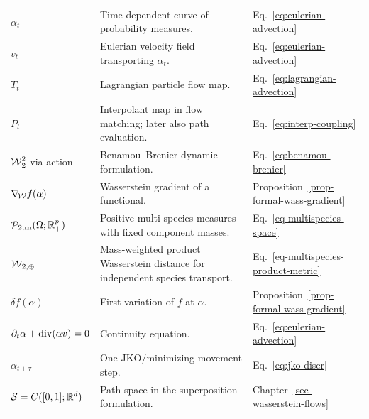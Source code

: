{\begin{longtable}{>{\raggedright\arraybackslash}p{}
                  >{\raggedright\arraybackslash}p{}
                  >{\raggedright\arraybackslash}p{}}
\hline
\multicolumn{3}{l}{\textbf{Dynamic OT and Wasserstein gradient flows}}\\
\hline
$\alpha_t$ & Time-dependent curve of probability measures. & Eq.~\eqref{eq:eulerian-advection} \\
$v_t$ & Eulerian velocity field transporting $\alpha_t$. & Eq.~\eqref{eq:eulerian-advection} \\
$T_t$ & Lagrangian particle flow map. & Eq.~\eqref{eq:lagrangian-advection} \\
$P_t$ & Interpolant map in flow matching; later also path evaluation. & Eq.~\eqref{eq:interp-coupling} \\
$\operatorname{\mathcal{W}}_2^2$ via action & Benamou--Brenier dynamic formulation. & Eq.~\eqref{eq:benamou-brenier} \\
$\nabla_{\!\operatorname{\mathcal{W}}} f(\alpha)$ & Wasserstein gradient of a functional. & Proposition~\ref{prop-formal-wass-gradient} \\
$\mathcal{P}_{2,\mathbf m}(\Omega;\mathbb{R}_+^p)$ & Positive multi-species measures with fixed component masses. & Eq.~\eqref{eq-multispecies-space} \\
$\operatorname{\mathcal{W}}_{2,\oplus}$ & Mass-weighted product Wasserstein distance for independent species transport. & Eq.~\eqref{eq-multispecies-product-metric} \\
$\delta f(\alpha)$ & First variation of $f$ at $\alpha$. & Proposition~\ref{prop-formal-wass-gradient} \\
$\partial_t\alpha+\operatorname{div}(\alpha v)=0$ & Continuity equation. & Eq.~\eqref{eq:eulerian-advection} \\
$\alpha_{t+\tau}$ & One JKO/minimizing-movement step. & Eq.~\eqref{eq:jko-discr} \\
$\mathcal{S}=C([0,1];\mathbb{R}^d)$ & Path space in the superposition formulation. & Chapter~\ref{sec-wasserstein-flows} \\
\end{longtable}
}
